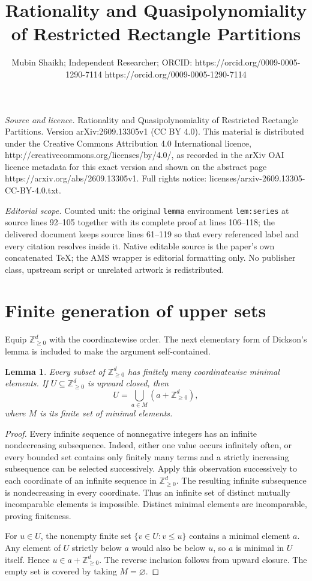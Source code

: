 \documentclass[10pt,a4paper]{amsart}
\newtheorem{lemma}[theorem]{Lemma}
\newcommand{\NN}{\mathbb Z_{\geq0}}
\begin{document}
\title[Rationality and Quasipolynomiality of Restricted Rectangle P]{Rationality and Quasipolynomiality of Restricted Rectangle Partitions}
\author{Mubin Shaikh; Independent Researcher; ORCID: https://orcid.org/0009-0005-1290-7114 https://orcid.org/0009-0005-1290-7114}
\date{}
\maketitle
\noindent\emph{Source and licence.} Rationality and Quasipolynomiality of Restricted Rectangle Partitions. Version arXiv:2609.13305v1 (CC BY 4.0). This material is distributed under the Creative Commons Attribution 4.0 International licence, http://creativecommons.org/licenses/by/4.0/, as recorded in the arXiv OAI licence metadata for this exact version and shown on the abstract page https://arxiv.org/abs/2609.13305v1. Full rights notice: licenses/arxiv-2609.13305-CC-BY-4.0.txt.\par\smallskip
\noindent\textit{Editorial scope.} Counted unit: the original \texttt{lemma} environment \texttt{lem:series} at source lines 92--105 together with its complete proof at lines 106--118; the delivered document keeps source lines 61--119 so that every referenced label and every citation resolves inside it. Native editable source is the paper's own concatenated TeX; the AMS wrapper is editorial formatting only. No publisher class, upstream script or unrelated artwork is redistributed.
\section{Finite generation of upper sets}
Equip $\NN^d$ with the coordinatewise order. The next elementary form
of Dickson's lemma is included to make the argument self-contained.
\begin{lemma}\label{lem:dickson}
Every subset of $\NN^d$ has finitely many coordinatewise minimal
elements. If $U\subseteq\NN^d$ is upward closed, then
\[
 U=\bigcup_{a\in M}(a+\NN^d),
\]
where $M$ is its finite set of minimal elements.
\end{lemma}
\begin{proof}
Every infinite sequence of nonnegative integers has an infinite
nondecreasing subsequence. Indeed, either one value occurs infinitely
often, or every bounded set contains only finitely many terms and a
strictly increasing subsequence can be selected successively.
Apply this observation successively to each coordinate of an infinite
sequence in $\NN^d$. The resulting infinite subsequence is nondecreasing
in every coordinate. Thus an infinite set of distinct mutually
incomparable elements is impossible. Distinct minimal elements are
incomparable, proving finiteness.

For $u\in U$, the nonempty finite set
$\{v\in U:v\leq u\}$ contains a minimal element $a$. Any element of
$U$ strictly below $a$ would also be below $u$, so $a$ is minimal in
$U$ itself. Hence $u\in a+\NN^d$. The reverse inclusion follows
from upward closure. The empty set is covered by taking $M=\varnothing$.
\end{proof}
\end{document}

